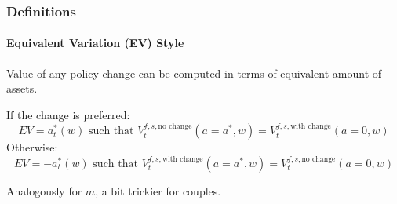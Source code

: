 \documentclass[aspectratio=169]{beamer}
\newcommand{\backupend}{
   \addtocounter{framenumberappendix}{-\value{framenumber}}
   \addtocounter{framenumber}{\value{framenumberappendix}} 
}
\begin{document}
\begin{frame}[label=welfare-methodology]
\frametitle{Definitions}
\framesubtitle{Equivalent Variation (EV) Style}
Value of any policy change can be computed in terms of equivalent amount of assets.

If the change is preferred:
\[EV = a^*_t(w) \text{ such that } V_{t}^{f,s,\text{no change}}(a=a^*,w) = V_{t}^{f,s,\text{with change}}(a=0,w)\]
Otherwise:
\[EV = -a^*_t(w) \text{ such that } V_{t}^{f,s,\text{with change}}(a=a^*,w) = V_{t}^{f,s,\text{no change}}(a=0,w)\]

Analogously for $m$, a bit trickier for couples.

\hyperlink{welfare-abortions}{} \hyperlink{welfare-child-support}{}


\end{frame}

\backupend
\end{document}
